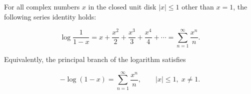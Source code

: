 For all complex numbers $x$ in the closed unit disk $|x| \leqslant 1$ other than $x = 1$, the following series identity holds:

$$
\log \frac{1}{1-x} = x + \frac{x^2}{2} + \frac{x^3}{3} + \frac{x^4}{4} + \cdots = \sum_{n=1}^{\infty} \frac{x^n}{n}.
$$

Equivalently, the principal branch of the logarithm satisfies

$$
-\log(1-x) = \sum_{n=1}^{\infty} \frac{x^n}{n}, \qquad |x| \leqslant 1,\; x \neq 1.
$$
